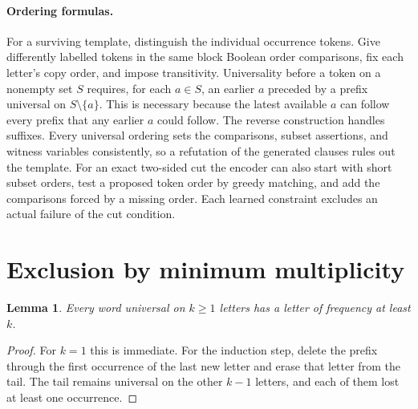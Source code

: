 \documentclass[11pt]{article}
\newtheorem{lemma}[theorem]{Lemma}
\begin{document}
\paragraph{Ordering formulas.}
For a surviving template, distinguish the individual occurrence tokens. Give differently labelled tokens in the same block Boolean order comparisons, fix each letter's copy order, and impose transitivity. Universality before a token on a nonempty set $S$ requires, for each $a\in S$, an earlier $a$ preceded by a prefix universal on $S\setminus\{a\}$. This is necessary because the latest available $a$ can follow every prefix that any earlier $a$ could follow. The reverse construction handles suffixes. Every universal ordering sets the comparisons, subset assertions, and witness variables consistently, so a refutation of the generated clauses rules out the template. For an exact two-sided cut the encoder can also start with short subset orders, test a proposed token order by greedy matching, and add the comparisons forced by a missing order. Each learned constraint excludes an actual failure of the cut condition.

\section{Exclusion by minimum multiplicity}\label{sec:cases}
\begin{lemma}\label{lem:heavy}
Every word universal on $k\ge1$ letters has a letter of frequency at least $k$.
\end{lemma}
\begin{proof}
For $k=1$ this is immediate. For the induction step, delete the prefix through the first occurrence of the last new letter and erase that letter from the tail. The tail remains universal on the other $k-1$ letters, and each of them lost at least one occurrence.
\end{proof}
\end{document}
